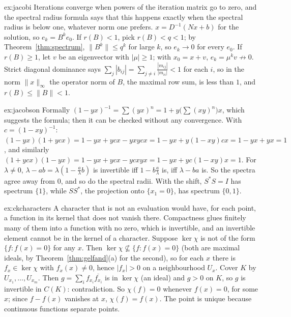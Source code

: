 \begin{solution}{ex:jacobi}
\idea Iterations converge when powers of the iteration matrix go to zero, and the spectral radius formula says that this happens exactly when the spectral radius is below one, whatever norm one prefers.
\writeup $x=D^{-1}(Nx+b)$ for the solution, so $e_k=B^ke_0$. If $r(B)<1$, pick $r(B)<q<1$; by Theorem~\ref{thm:spectrum}, $\|B^k\|\le q^k$ for large $k$, so $e_k\to0$ for every $e_0$. If $r(B)\ge1$, let $v$ be an eigenvector with
$|\mu|\ge1$; with $x_0=x+v$, $e_k=\mu^kv\not\to0$. Strict diagonal dominance says $\sum_j|b_{ij}|=\sum_{j\ne i}\frac{|m_{ij}|}{|m_{ii}|}<1$ for each $i$, so in the norm $\|x\|_\infty$ the operator norm of $B$, the maximal row sum, is less than $1$, and
$r(B)\le\|B\|<1$.
\end{solution}

\begin{solution}{ex:jacobson}
\idea Formally $(1-yx)^{-1}=\sum(yx)^n=1+y\bigl(\sum(xy)^n\bigr)x$, which suggests the formula; then it can be checked without any convergence.
\writeup With $c=(1-xy)^{-1}$: $(1-yx)(1+ycx)=1-yx+ycx-yxycx=1-yx+y(1-xy)cx=1-yx+yx=1$, and similarly $(1+ycx)(1-yx)=1-yx+ycx-ycxyx=1-yx+yc(1-xy)x=1$. For $\lambda\ne0$, $\lambda-ab=\lambda(1-\frac a\lambda b)$ is invertible iff
$1-b\frac a\lambda$ is, iff $\lambda-ba$ is. So the spectra agree away from $0$, and so do the spectral radii. With the shift, $S^*S=I$ has spectrum $\{1\}$, while $SS^*$, the projection onto $\{x_1=0\}$, has spectrum $\{0,1\}$.
\end{solution}

\begin{solution}{ex:ckcharacters}
\idea A character that is not an evaluation would have, for each point, a function in its kernel that does not vanish there. Compactness glues finitely many of them into a function with no zero, which is invertible, and an
invertible element cannot be in the kernel of a character.
\writeup Suppose $\ker\chi$ is not of the form $\{f:f(x)=0\}$ for any $x$. Then $\ker\chi\not\subseteq\{f:f(x)=0\}$ (both are maximal ideals, by Theorem~\ref{thm:gelfand}(a) for the second), so for each $x$ there is $f_x\in\ker\chi$ with
$f_x(x)\ne0$, hence $|f_x|>0$ on a neighbourhood $U_x$. Cover $K$ by $U_{x_1},\dots,U_{x_m}$. Then $g=\sum_if_{x_i}\overline{f_{x_i}}$ is in $\ker\chi$ (an ideal) and $g>0$ on $K$, so $g$ is invertible in $C(K)$: contradiction. So
$\chi(f)=0$ whenever $f(x)=0$, for some $x$; since $f-f(x)$ vanishes at $x$, $\chi(f)=f(x)$. The point is unique because continuous functions separate points.
\end{solution}

